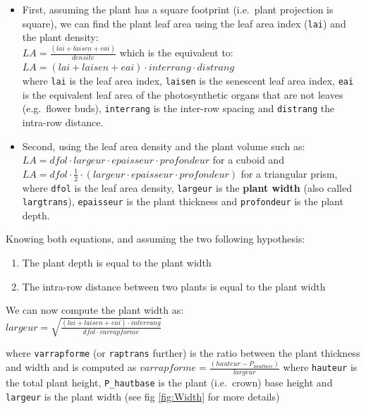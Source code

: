 \documentclass[]{book}
\providecommand{\tightlist}{%
  \setlength{\itemsep}{0pt}\setlength{\parskip}{0pt}}
\begin{document}
\begin{itemize}
\item
  First, assuming the plant has a square footprint (i.e.~plant projection is square), we can find the plant leaf area using the leaf area index (\texttt{lai}) and the plant density:\\
  \(LA=\frac{\left(lai+laisen+eai\right)}{densite}\) which is the equivalent to: \(LA=\left(lai+laisen+eai\right)\cdot interrang\cdot distrang\)\\
  where \texttt{lai} is the leaf area index, \texttt{laisen} is the senescent leaf area index, \texttt{eai} is the equivalent leaf area of the photosynthetic organs that are not leaves (e.g.~flower buds), \texttt{interrang} is the inter-row spacing and \texttt{distrang} the intra-row distance.
\item
  Second, using the leaf area density and the plant volume such as:\\
  \(LA=dfol\cdot largeur\cdot epaisseur\cdot profondeur\) for a cuboid and \(LA=dfol\cdot\frac{1}{2}\cdot\left(largeur\cdot epaisseur\cdot profondeur\right)\) for a triangular prism, where \texttt{dfol} is the leaf area density, \texttt{largeur} is the \textbf{plant width} (also called \texttt{largtrans}), \texttt{epaisseur} is the plant thickness and \texttt{profondeur} is the plant depth.
\end{itemize}

Knowing both equations, and assuming the two following hypothesis:

\begin{enumerate}
\def\labelenumi{\arabic{enumi}.}
\tightlist
\item
  The plant depth is equal to the plant width
\item
  The intra-row distance between two plants is equal to the plant width
\end{enumerate}

We can now compute the plant width as:\\
\(largeur=\sqrt{\frac{(lai+laisen+eai)\cdot interrang}{dfol\cdot varrapforme}}\)

where \texttt{varrapforme} (or \texttt{raptrans} further) is the ratio between the plant thickness and width and is computed as \(varrapforme=\frac{(hauteur-P_{hautbase})}{largeur}\) where \texttt{hauteur} is the total plant height, \texttt{P\_hautbase} is the plant (i.e.~crown) base height and \texttt{largeur} is the plant width (see fig \ref{fig:Width} for more details)
\end{document}
